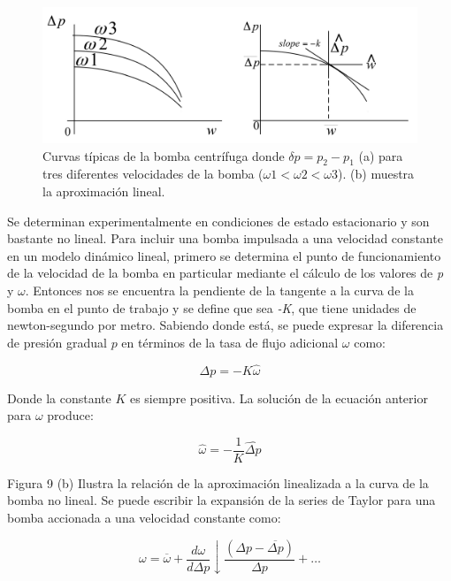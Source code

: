 \documentclass[a4paper,12pt,twoside]{proyectotanquesecci}
\begin{document}
\begin{figure}[h]
\centering
\includegraphics[scale=0.5]{Figura8}
\renewcommand{\figurename}{Fig.}
\caption{Curvas típicas de la bomba centrífuga donde $\delta p=p_{2}-p_{1}$ (a) para tres diferentes velocidades de la bomba ($\omega1 < \omega2 < \omega3$). (b) muestra la aproximación lineal.}
\label{Curvas típicas de la bomba centrífuga donde $\delta p=p_{2}-p_{1}$ (a) para tres diferentes velocidades de la bomba ($\omega1 < \omega2 < \omega3$). (b) muestra la aproximación lineal.}
\end{figure}

Se determinan experimentalmente en condiciones de estado estacionario y son bastante no lineal. Para incluir una bomba impulsada a una velocidad constante en un modelo dinámico lineal, primero se determina el punto de funcionamiento de la velocidad de la bomba en particular mediante el cálculo de los valores de \textit{p} y $\omega$. Entonces nos se encuentra la pendiente de la tangente a la curva de la bomba en el punto de trabajo y se define que sea \textit{-K}, que tiene unidades de newton-segundo por metro. Sabiendo donde está, se puede expresar la diferencia de presión gradual $p$ en términos de la tasa de flujo adicional $\omega$ como:

\begin{equation}
\Delta p=-K\widehat {\omega}
\end{equation}

Donde la constante $K$ es siempre positiva. La solución de la ecuación anterior para $\omega$ produce:

\begin{equation}
\widehat {\omega}=-\frac {1}{K}\widehat {\Delta p}
\end{equation}

Figura 9 (b) Ilustra la relación de la aproximación linealizada a la curva de la bomba no lineal. Se puede escribir la expansión de la series de Taylor para una bomba accionada a una velocidad constante como:

\begin{equation}
\omega =\overline {\omega }+\frac {d\omega }{d\Delta p} \downarrow \frac {\left( \Delta p-\overline {\Delta p}\right)}{\Delta p} +\ldots 
\end{equation}
\end{document}
